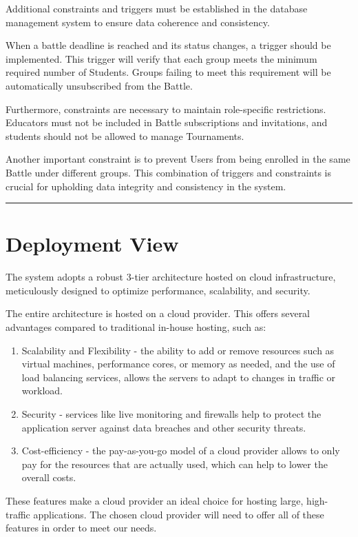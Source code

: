\documentclass{Configuration_Files/Template}
\begin{document}
Additional constraints and triggers must be established in the database management system to ensure data coherence and consistency.

When a battle deadline is reached and its status changes, a trigger should be implemented. This trigger will verify that each group meets the minimum required number of Students. Groups failing to meet this requirement will be automatically unsubscribed from the Battle.

Furthermore, constraints are necessary to maintain role-specific restrictions. Educators must not be included in Battle subscriptions and invitations, and students should not be allowed to manage Tournaments.

Another important constraint is to prevent Users from being enrolled in the same Battle under different groups. This combination of triggers and constraints is crucial for upholding data integrity and consistency in the system.

{\color{bluepoli}\rule{\linewidth}{0.1pt}}

\section{Deployment View}

The system adopts a robust 3-tier architecture hosted on cloud infrastructure, meticulously designed to optimize performance, scalability, and security.

The entire architecture is hosted on a cloud provider. This offers several advantages compared to traditional in-house hosting, such as:
\begin{enumerate}
\item Scalability and Flexibility - the ability to add or remove resources such as virtual machines, performance cores, or memory as needed, and the use of load balancing services, allows the servers to adapt to changes in traffic or workload.
\item Security - services like live monitoring and firewalls help to protect the application server against data breaches and other security threats.
\item Cost-efficiency - the pay-as-you-go model of a cloud provider allows to only pay for the resources that are actually used, which can help to lower the overall costs.
\end{enumerate}
These features make a cloud provider an ideal choice for hosting large, high-traffic applications. The chosen cloud provider will need to offer all of these features in order to meet our needs.
\end{document}
